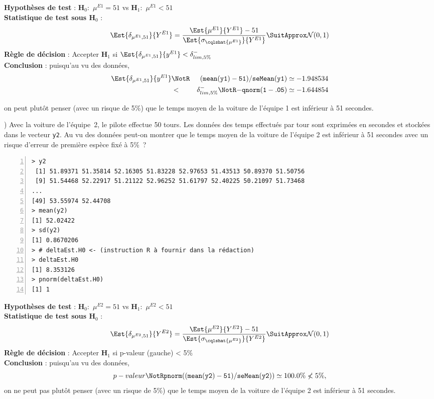 \documentclass[10pt]{report}
\begin{document}
\begin{exercice}
\begin{Correction}

\noindent \textbf{Hypothèses de test} : $\mathbf{H}_0:$ $\mu^{E1}=51$ vs {\large $\mathbf{H}_1:$ $\mu^{E1}<51$}\\
\textbf{Statistique de test sous $\mathbf{H}_0$} :
  $$
  \Est{\delta_{\mu^{E1},51}}{Y^{E1}}= {\displaystyle \frac{\Est{\mu^{E1}}{Y^{E1}}-51}{
\Est{\sigma_{\cqlshat{\mu^{E1}}}}{Y^{E1}}
}} 
  \SuitApprox \mathcal{N}(0,1)
  $$
\textbf{Règle de décision} : Accepter $\mathbf{H}_1$ si 
  $\Est{\delta_{\mu^{E1},51}}{y^{E1}} < \delta^-_{lim,5\%}$\\
\noindent \textbf{Conclusion} :
puisqu'au vu des données, 
  \begin{eqnarray*}
\Est{\delta_{\mu^{E1},51}}{y^{E1}} &\NotR&\mathtt{(mean(y1)-51)/seMean(y1)}\simeq -1.948534\\& <  & \delta^-_{lim,5\%} \NotR \mathtt{-qnorm(1-.05)}\simeq-1.644854
\end{eqnarray*}
  
on peut plutôt penser (avec un risque de 5\%) que le temps moyen de la voiture de l'équipe 1 est inférieur à 51 secondes.
\end{Correction}


) Avec la voiture de l'équipe~2,  le pilote effectue 50 tours. Les données des temps effectués par tour sont exprimées en secondes et stockées dans le vecteur  \texttt{y2}. Au vu des données peut-on montrer que le temps moyen de la voiture de l'équipe 2 est inférieur à 51 secondes  avec un risque d'erreur de première espèce fixé à 5\%~?\\

\IndicR
\begin{Verbatim}[frame=leftline,fontfamily=tt,fontshape=n,numbers=left]
> y2
 [1] 51.89371 51.35814 52.16305 51.83228 52.97653 51.43513 50.89370 51.50756
 [9] 51.54468 52.22917 51.21122 52.96252 51.61797 52.40225 50.21097 51.73468
...
[49] 53.55974 52.44708
> mean(y2)
[1] 52.02422
> sd(y2)
[1] 0.8670206
> # deltaEst.H0 <- (instruction R à fournir dans la rédaction)
> deltaEst.H0
[1] 8.353126
> pnorm(deltaEst.H0)
[1] 1
\end{Verbatim}



\begin{Correction}

\noindent \textbf{Hypothèses de test} : $\mathbf{H}_0:$ $\mu^{E2}=51$ vs {\large $\mathbf{H}_1:$ $\mu^{E2}<51$}\\
\textbf{Statistique de test sous $\mathbf{H}_0$} :
  $$
  \Est{\delta_{\mu^{E2},51}}{Y^{E2}}= {\displaystyle \frac{\Est{\mu^{E2}}{Y^{E2}}-51}{
\Est{\sigma_{\cqlshat{\mu^{E2}}}}{Y^{E2}}
}} 
  \SuitApprox \mathcal{N}(0,1)
  $$
\textbf{Règle de décision} : Accepter $\mathbf{H}_1$ si 
  p-valeur (gauche) < 5\%\\
\noindent \textbf{Conclusion} :
puisqu'au vu des données, 
  \[
p-valeur\NotR\mathtt{pnorm((mean(y2)-51)/seMean(y2))} \simeq 100.0\%\nless5\%,
\]
on ne peut pas plutôt penser (avec un risque de 5\%) que le temps moyen de la voiture de l'équipe 2 est inférieur à 51 secondes.
\end{Correction}



\end{exercice}
\end{document}
